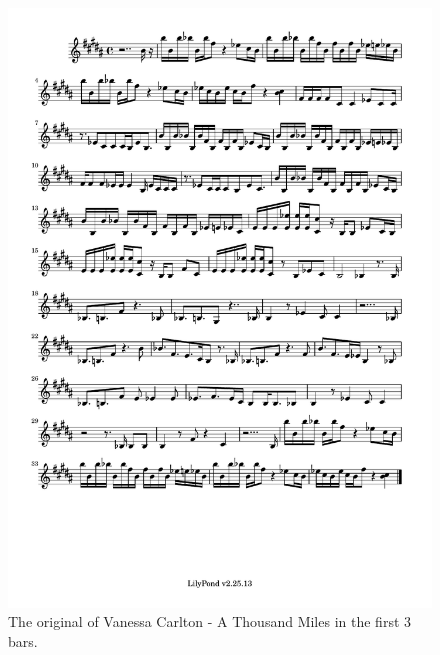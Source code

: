 \documentclass[11pt]{article}
\theoremstyle{definition}
\begin{document}
\begin{figure}
\centering
\includegraphics[trim=1cm 26.5cm 1cm 0.5cm, clip, scale=0.6]{Original_ATM.pdf}
\caption{The original of Vanessa Carlton - A Thousand Miles in the first 3 bars.} 
\label{fig:OATM}
\end{figure}
\end{document}
